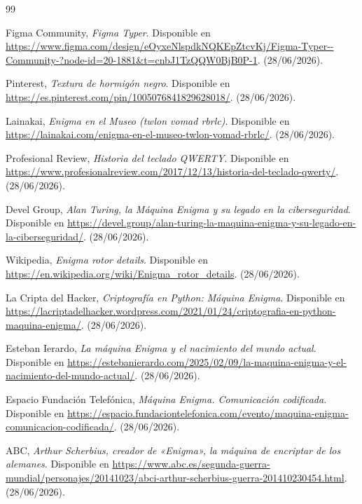
\begin{thebibliography}{99}

 Figma Community, {\it Figma Typer}. Disponible en \url{https://www.figma.com/design/eOyxeNlspdkNQKEpZtcvKj/Figma-Typer--Community-?node-id=20-1881&t=cnbJ1TzQQW0BjB0P-1}. (28/06/2026).

 Pinterest, {\it Textura de hormigón negro}. Disponible en \url{https://es.pinterest.com/pin/1005076841829628018/}. (28/06/2026).

 Lainakai, {\it Enigma en el Museo (twlon vomad rbrlc)}. Disponible en \url{https://lainakai.com/enigma-en-el-museo-twlon-vomad-rbrlc/}. (28/06/2026).

 Profesional Review, {\it Historia del teclado QWERTY}. Disponible en \url{https://www.profesionalreview.com/2017/12/13/historia-del-teclado-qwerty/}. (28/06/2026).

 Devel Group, {\it Alan Turing, la Máquina Enigma y su legado en la ciberseguridad}. Disponible en \url{https://devel.group/alan-turing-la-maquina-enigma-y-su-legado-en-la-ciberseguridad/}. (28/06/2026).

 Wikipedia, {\it Enigma rotor details}. Disponible en \url{https://en.wikipedia.org/wiki/Enigma_rotor_details}. (28/06/2026).

 La Cripta del Hacker, {\it Criptografía en Python: Máquina Enigma}. Disponible en \url{https://lacriptadelhacker.wordpress.com/2021/01/24/criptografia-en-python-maquina-enigma/}. (28/06/2026).

 Esteban Ierardo, {\it La máquina Enigma y el nacimiento del mundo actual}. Disponible en \url{https://estebanierardo.com/2025/02/09/la-maquina-enigma-y-el-nacimiento-del-mundo-actual/}. (28/06/2026).

 Espacio Fundación Telefónica, {\it Máquina Enigma. Comunicación codificada}. Disponible en \url{https://espacio.fundaciontelefonica.com/evento/maquina-enigma-comunicacion-codificada/}. (28/06/2026).

 ABC, {\it Arthur Scherbius, creador de «Enigma», la máquina de encriptar de los alemanes}. Disponible en \url{https://www.abc.es/segunda-guerra-mundial/personajes/20141023/abci-arthur-scherbius-guerra-201410230454.html}. (28/06/2026).


\end{thebibliography}

